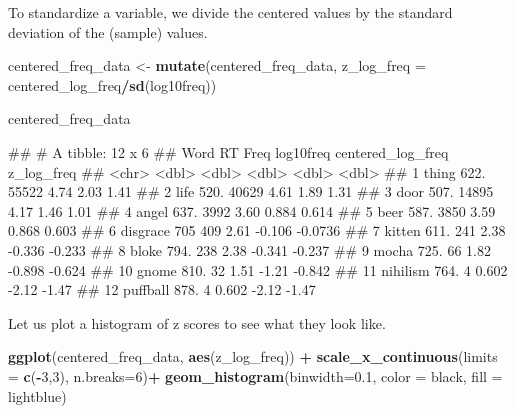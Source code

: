 \documentclass[
]{book}
\newenvironment{Shaded}{\begin{snugshade}}{\end{snugshade}}
\newcommand{\AttributeTok}[1]{\textcolor[rgb]{0.13,0.29,0.53}{#1}}
\newcommand{\DecValTok}[1]{\textcolor[rgb]{0.00,0.00,0.81}{#1}}
\newcommand{\FloatTok}[1]{\textcolor[rgb]{0.00,0.00,0.81}{#1}}
\newcommand{\FunctionTok}[1]{\textcolor[rgb]{0.13,0.29,0.53}{\textbf{#1}}}
\newcommand{\NormalTok}[1]{#1}
\newcommand{\OtherTok}[1]{\textcolor[rgb]{0.56,0.35,0.01}{#1}}
\newcommand{\SpecialCharTok}[1]{\textcolor[rgb]{0.81,0.36,0.00}{\textbf{#1}}}
\newcommand{\StringTok}[1]{\textcolor[rgb]{0.31,0.60,0.02}{#1}}
\begin{document}
To standardize a variable, we divide the centered values by the standard deviation of the (sample) values.

\begin{Shaded}
\begin{Highlighting}[]
\NormalTok{centered\_freq\_data }\OtherTok{\textless{}{-}} \FunctionTok{mutate}\NormalTok{(centered\_freq\_data, }\AttributeTok{z\_log\_freq =}\NormalTok{ centered\_log\_freq}\SpecialCharTok{/}\FunctionTok{sd}\NormalTok{(log10freq))}

\NormalTok{centered\_freq\_data}
\end{Highlighting}
\end{Shaded}

\begin{Shaded}
\begin{Highlighting}[]
\NormalTok{\#\# \# A tibble: 12 x 6}
\NormalTok{\#\#    Word        RT  Freq log10freq centered\_log\_freq z\_log\_freq}
\NormalTok{\#\#    \textless{}chr\textgreater{}    \textless{}dbl\textgreater{} \textless{}dbl\textgreater{}     \textless{}dbl\textgreater{}             \textless{}dbl\textgreater{}      \textless{}dbl\textgreater{}}
\NormalTok{\#\#  1 thing     622. 55522     4.74              2.03      1.41  }
\NormalTok{\#\#  2 life      520. 40629     4.61              1.89      1.31  }
\NormalTok{\#\#  3 door      507. 14895     4.17              1.46      1.01  }
\NormalTok{\#\#  4 angel     637.  3992     3.60              0.884     0.614 }
\NormalTok{\#\#  5 beer      587.  3850     3.59              0.868     0.603 }
\NormalTok{\#\#  6 disgrace  705    409     2.61             {-}0.106    {-}0.0736}
\NormalTok{\#\#  7 kitten    611.   241     2.38             {-}0.336    {-}0.233 }
\NormalTok{\#\#  8 bloke     794.   238     2.38             {-}0.341    {-}0.237 }
\NormalTok{\#\#  9 mocha     725.    66     1.82             {-}0.898    {-}0.624 }
\NormalTok{\#\# 10 gnome     810.    32     1.51             {-}1.21     {-}0.842 }
\NormalTok{\#\# 11 nihilism  764.     4     0.602            {-}2.12     {-}1.47  }
\NormalTok{\#\# 12 puffball  878.     4     0.602            {-}2.12     {-}1.47}
\end{Highlighting}
\end{Shaded}

Let us plot a histogram of z scores to see what they look like.

\begin{Shaded}
\begin{Highlighting}[]
\FunctionTok{ggplot}\NormalTok{(centered\_freq\_data, }\FunctionTok{aes}\NormalTok{(z\_log\_freq)) }\SpecialCharTok{+}
    \FunctionTok{scale\_x\_continuous}\NormalTok{(}\AttributeTok{limits =} \FunctionTok{c}\NormalTok{(}\SpecialCharTok{{-}}\DecValTok{3}\NormalTok{,}\DecValTok{3}\NormalTok{), }\AttributeTok{n.breaks=}\DecValTok{6}\NormalTok{)}\SpecialCharTok{+}
        \FunctionTok{geom\_histogram}\NormalTok{(}\AttributeTok{binwidth=}\FloatTok{0.1}\NormalTok{,}
                       \AttributeTok{color =} \StringTok{\textquotesingle{}black\textquotesingle{}}\NormalTok{,}
                       \AttributeTok{fill =} \StringTok{\textquotesingle{}lightblue\textquotesingle{}}\NormalTok{)}
\end{Highlighting}
\end{Shaded}
\end{document}
